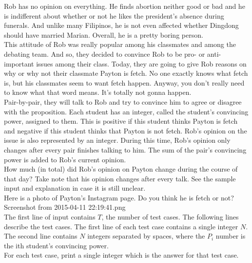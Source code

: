 
Rob has no opinion on everything. He finds abortion neither good or bad and he is indifferent about whether or not he likes the president's absence during funerals. And unlike many Filipinos, he is not even affected whether Dingdong should have married Marian. Overall, he is a pretty boring person.\\

This attitude of Rob was really popular among his classmates and among the debating team. And so, they decided to convince Rob to be pro- or anti- important issues among their class. Today, they are going to give Rob reasons on why or why not their classmate Payton is fetch. No one exactly knows what fetch is, but his classmates seem to want fetch happen. Anyway, you don't really need to know what that word means. It's totally not gonna happen.\\

Pair-by-pair, they will talk to Rob and try to convince him to agree or disagree with the proposition. Each student has an integer, called the student's convincing power, assigned to them. This is positive if this student thinks Payton is fetch and negative if this student thinks that Payton is not fetch. Rob's opinion on the issue is also represented by an integer. During this time, Rob's opinion only changes after every pair finishes talking to him. The sum of the pair's convincing power is added to Rob's current opinion.\\

How much (in total) did Rob's opinion on Payton change during the course of that day? Take note that his opinion changes after every talk. See the sample input and explanation in case it is still unclear.\\

Here is a photo of Payton's Instagram page. Do you think he is fetch or not? Screenshot from 2015-04-11 22:19:41.png\\

The first line of input contains $T$, the number of test cases. The following lines describe the test cases. The first line of each test case contains a single integer $N$. The second line contains $N$ integers separated by spaces, where the $P_i$ number is the ith student's convincing power.\\

For each test case, print a single integer which is the answer for that test case.\\
